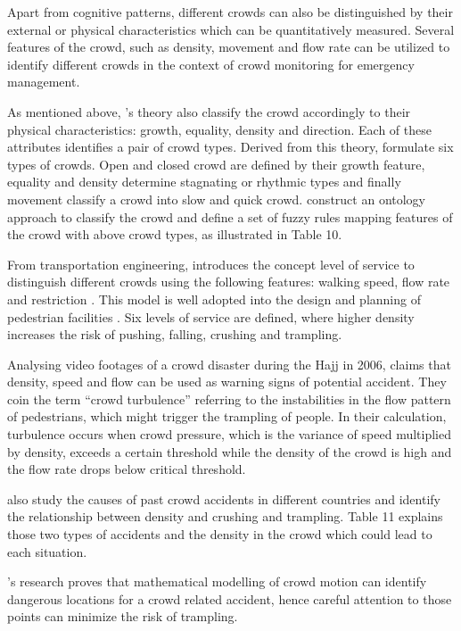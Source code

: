 Apart from cognitive patterns, different crowds can also be distinguished by their external or physical characteristics which can be quantitatively measured. Several features of the crowd, such as density, movement and flow rate can be utilized to identify different crowds in the context of crowd monitoring for emergency management.

As mentioned above, \citet{Canetti1962}’s theory also classify the crowd accordingly to their physical characteristics: growth, equality, density and direction. Each of these attributes identifies a pair of crowd types. Derived from this theory, \citet{Bandini2011} formulate six types of crowds. Open and closed crowd are defined by their growth feature, equality and density determine stagnating or rhythmic types and finally movement classify a crowd into slow and quick crowd. \citet{Bandini2011} construct an ontology approach to classify the crowd and define a set of fuzzy rules mapping features of the crowd with above crowd types, as illustrated in Table 10.

From transportation engineering, \citet{Fruin1970} introduces the concept level of service to distinguish different crowds using the following features: walking speed, flow rate and restriction \citep{Challenger2009}. This model is well adopted into the design and planning of pedestrian facilities \citep{Shiwakoti2008,Ye2008}. Six levels of service are defined, where higher density increases the risk of pushing, falling, crushing and trampling.

Analysing video footages of a crowd disaster during the Hajj in 2006, \citet{Helbing2007} claims that density, speed and flow can be used as warning signs of potential accident. They coin the term “crowd turbulence” referring to the instabilities in the flow pattern of pedestrians, which might trigger the trampling of people. In their calculation, turbulence occurs when crowd pressure, which is the variance of speed multiplied by density, exceeds a certain threshold while the density of the crowd is high and the flow rate drops below critical threshold.

\citet{Lee2005} also study the causes of past crowd accidents in different countries and identify the relationship between density and crushing and trampling. Table 11 explains those two types of accidents and the density in the crowd which could lead to each situation.

\citet{Lee2005}’s research proves that mathematical modelling of crowd motion can identify dangerous locations for a crowd related accident, hence careful attention to those points can minimize the risk of trampling.

